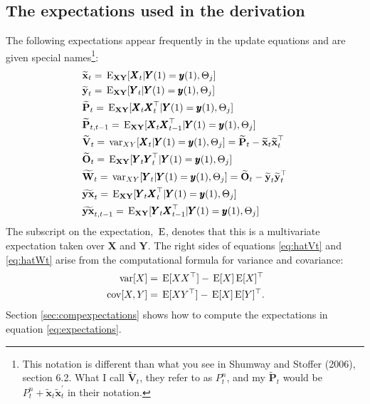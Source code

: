 \documentclass[]{article}
\def\E{\,\textup{\textrm{E}}}
\def\EXy{\,\textup{\textrm{E}}_{\text{{\bf XY}}}}
\def\OO{\mbox{$\mathbf O$}}
\def\PP{\mbox{$\mathbf P$}}  \def\pp{\mbox{$\mathbf p$}}
\def\VV{\mbox{$\mathbf V$}}	\def\vv{\mbox{$\mathbf v$}}
\def\WW{\mbox{$\mathbf W$}}	\def\ww{\mbox{$\mathbf w$}}
\def\XX{\mbox{$\pmb{X}$}}	\def\xx{\mbox{$\pmb{x}$}}
\def\YY{\mbox{$\pmb{Y}$}}	\def\yy{\mbox{$\pmb{y}$}}
\def\var{\,\textup{\textrm{var}}}
\def\cov{\,\textup{\textrm{cov}}}
\def\hatxt{\widetilde{\mbox{$\mathbf x$}}_t}
\def\hatyt{\widetilde{\mbox{$\mathbf y$}}_t}
\def\hatOt{\widetilde{\OO}_t}
\def\hatWt{\widetilde{\WW}_t}
\def\hatYXt{\widetilde{\mbox{$\mathbf{y}\mathbf{x}$}}_t}
\def\hatYXttm{\widetilde{\mbox{$\mathbf{y}\mathbf{x}$}}_{t,t-1}}
\def\hatPt{\widetilde{\PP}_t}
\def\hatPttm{\widetilde{\PP}_{t,t-1}}
\def\hatVt{\widetilde{\VV}_t}
\begin{document}
\subsection{The expectations used in the derivation}\label{sec:expectations}
The following expectations appear frequently in the update equations and are given special names\footnote{This notation is different than what you see in Shumway and Stoffer (2006), section 6.2.  What I call $\hatVt$, they refer to as $P_t^n$, and my $\hatPt$ would be $P_t^n + \hatxt \hatxt^\prime$ in their notation.}:
\begin{subequations}\label{eq:expectations}
\begin{align}
&\hatxt = \EXy[\XX_t | \YY(1)=\yy(1), \Theta_j]\\
&\hatyt = \EXy[\YY_t | \YY(1)=\yy(1), \Theta_j]\\
&\hatPt=\EXy[\XX_t\XX_t^\top | \YY(1)=\yy(1), \Theta_j]\\
&\hatPttm=\EXy[\XX_{t}\XX_{t-1}^\top | \YY(1)=\yy(1), \Theta_j]\\
&\hatVt = \var_{XY}[\XX_t|\YY(1)=\yy(1), \Theta_j] = \hatPt-\hatxt\hatxt^\top\label{eq:hatVt}\\
&\hatOt=\EXy[\YY_t\YY_t^\top | \YY(1)=\yy(1), \Theta_j]\\
&\hatWt = \var_{XY}[\YY_t|\YY(1)=\yy(1), \Theta_j] = \hatOt-\hatyt\hatyt^\top\label{eq:hatWt}\\
&\hatYXt = \EXy[\YY_t\XX_t^\top| \YY(1)=\yy(1), \Theta_j]\\
&\hatYXttm = \EXy[\YY_t\XX_{t-1}^\top| \YY(1)=\yy(1), \Theta_j]
\end{align}
\end{subequations}
The subscript on the expectation, $\E$, denotes that this is a multivariate expectation taken over $\XX$ and $\YY$.  The right sides of equations \ref{eq:hatVt} and \ref{eq:hatWt} arise from the computational formula for variance and covariance: 
\begin{align}\label{eq:comp.formula.variance}
\var[X] &= \E[XX^\top] - \E[X]\E[X]^\top\\
\cov[X,Y] &= \E[XY^\top] - \E[X]\E[Y]^\top.	
\end{align}
Section \ref{sec:compexpectations} shows how to compute the expectations in equation \ref{eq:expectations}.
\end{document}
